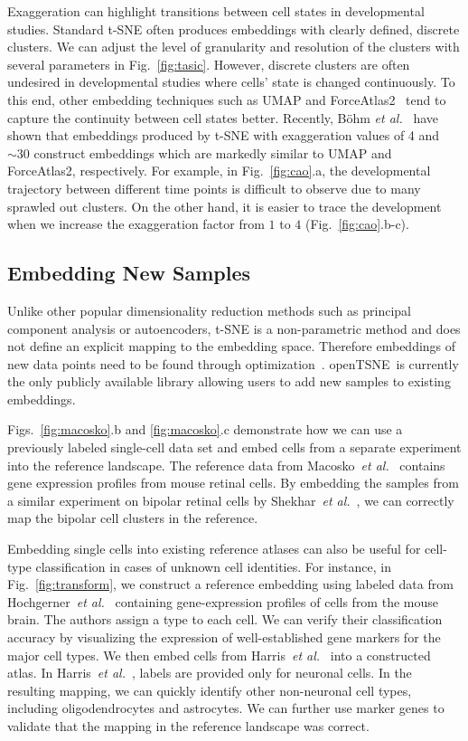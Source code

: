\documentclass[twocolumn]{bmcart}
\newcommand{\opentsne}{\textsf{openTSNE}}
\begin{document}
Exaggeration can highlight transitions between cell states in developmental studies. Standard t-SNE often produces embeddings with clearly defined, discrete clusters. We can adjust the level of granularity and resolution of the clusters with several parameters in Fig.~\ref{fig:tasic}. However, discrete clusters are often undesired in developmental studies where cells' state is changed continuously. To this end, other embedding techniques such as UMAP and ForceAtlas2~\cite{jacomy2014forceatlas2} tend to capture the continuity between cell states better. Recently, B{\"o}hm \textit{et al.}~\cite{bohm2020unifying} have shown that embeddings produced by t-SNE with exaggeration values of 4 and $\sim30$ construct embeddings which are markedly similar to UMAP and ForceAtlas2, respectively. For example, in Fig.~\ref{fig:cao}.a, the developmental trajectory between different time points is difficult to observe due to many sprawled out clusters. On the other hand, it is easier to trace the development when we increase the exaggeration factor from $1$ to $4$ (Fig.~\ref{fig:cao}.b-c).

\subsection*{Embedding New Samples}

Unlike other popular dimensionality reduction methods such as principal
component analysis or autoencoders, t-SNE is a non-parametric method and does
not define an explicit mapping to the embedding space. Therefore embeddings of
new data points need to be found through
optimization~\cite{policar2019embedding}. \opentsne\ is currently the only
publicly available library allowing users to add new samples to existing
embeddings.

Figs.~\ref{fig:macosko}.b and \ref{fig:macosko}.c demonstrate how we can use a
previously labeled single-cell data set and embed cells from a separate
experiment into the reference landscape. The reference data from
Macosko~\textit{et al.}~\cite{macosko2015highly} contains gene expression
profiles from mouse retinal cells. By embedding the samples from a similar
experiment on bipolar retinal cells by Shekhar~\textit{et
al.}~\cite{shekhar2016comprehensive}, we can correctly map the bipolar cell
clusters in the reference.

Embedding single cells into existing reference atlases can also be useful for
cell-type classification in cases of unknown cell identities. For instance, in
Fig.~\ref{fig:transform}, we construct a reference embedding using labeled data
from Hochgerner~\textit{et al.}~\cite{hochgerner2018conserved} containing
gene-expression profiles of cells from the mouse brain. The authors assign a
type to each cell. We can verify their classification accuracy by visualizing
the expression of well-established gene markers for the major cell types. We
then embed cells from Harris~\textit{et al.}~\cite{harris2018classes} into a
constructed atlas. In Harris~\textit{et al.}~, labels are provided only for
neuronal cells. In the resulting mapping, we can quickly identify other
non-neuronal cell types, including oligodendrocytes and astrocytes. We can
further use marker genes to validate that the mapping in the reference landscape
was correct. 
\end{document}
